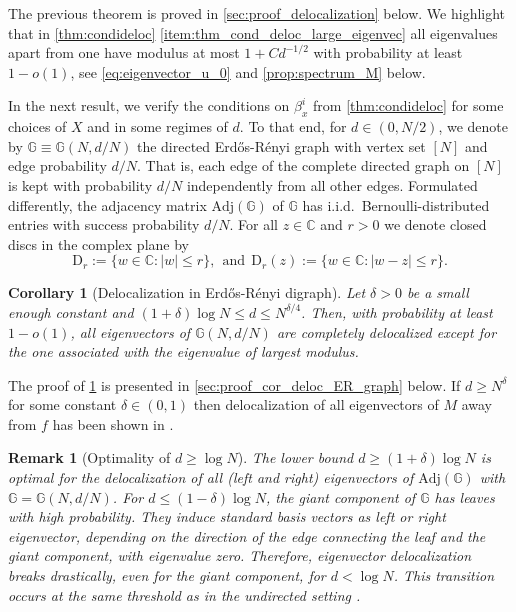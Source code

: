 \documentclass[10pt,a4paper]{amsart}
\newcommand{\abs}[1]{\left| #1 \right|}
\newcommand{\C}{\mathbb{C}}
\newtheorem{corollary}{Corollary}[section]
\newtheorem{remark}{Remark}[section]
\numberwithin{equation}{section}
\begin{document}
	
	The previous theorem is proved in \cref{sec:proof_delocalization} below. 
	We highlight that in \cref{thm:condideloc} \cref{item:thm_cond_deloc_large_eigenvec} all eigenvalues apart from one have modulus at most $1 + Cd^{-1/2}$ 
	with probability at least $1-o(1)$, see \cref{eq:eigenvector_u_0} and \cref{prop:spectrum_M} below. 
	
	In the next result, we verify the conditions on $\beta_x^i$ from \cref{thm:condideloc} for some choices of $X$ and in some regimes of $d$.  
	To that end, for $d \in (0,N/2)$, we denote by $\mathbb{G} \equiv \mathbb{G}(N,d/N)$ the directed Erd{\H o}s-R\'enyi graph with vertex set $[N]$ and edge probability $d/N$. That is, each edge of the complete directed graph on $[N]$ is kept with probability $d/N$ independently from all other edges. Formulated differently, the adjacency matrix $\mathrm{Adj}(\mathbb G)$ of $\mathbb{G}$ has i.i.d.\ Bernoulli-distributed entries with success probability $d/N$.  For all $z \in \C$ and $r > 0$ we denote closed discs in the complex plane by 
	\begin{equation*}
		\mathrm{D}_{r}:= \{ w \in \C \colon \abs{w} \le r\}, ~~ \text{and} ~~ \mathrm{D}_r(z) :=\{ w \in \C \colon  \abs{w-z} \le r\}.
	\end{equation*}

	
	\begin{corollary}[Delocalization in Erd{\H o}s-R\'enyi digraph] \label{cor:delocalization_unconditional} 
	Let $\delta>0$ be a small enough constant and $(1+ \delta) \log N \le d \le N^{\delta/4}$. 
 Then, with probability at least $1-o(1)$, all eigenvectors of $\mathbb{G}(N,d/N)$ are completely delocalized except for the one associated with the eigenvalue of largest modulus.
	\end{corollary} 

	The proof of \cref{cor:delocalization_unconditional} is presented in \cref{sec:proof_cor_deloc_ER_graph} below.  
	If $d \geq N^\delta$ for some constant $\delta \in (0,1)$ then delocalization of all eigenvectors of $M$ away from $f$ has been shown in \cite[Theorem~1.2 (ii)]{HeDigraph}. 
	
	\begin{remark}[Optimality of $d \geq \log N$] \label{rem:leaves}
	The lower bound $d \geq (1 + \delta) \log N$ is optimal for the delocalization of all (left and right) eigenvectors of $\mathrm{Adj}(\mathbb{G})$ with $\mathbb{G} = \mathbb{G}(N,d/N)$. 
	For $d \leq (1 - \delta) \log N$, the giant component of $\mathbb{G}$ has leaves with high probability. They induce standard basis vectors as left or right eigenvector, depending on the direction of the edge connecting the leaf and the giant component, with eigenvalue zero.  Therefore, eigenvector delocalization breaks drastically, even for the giant component, 
	for $d < \log N$. This transition occurs at the same threshold as in the undirected setting \cite{alt2021delocalization,ADK_deloc_everywhere}.
	\end{remark} 
	
\end{document}
